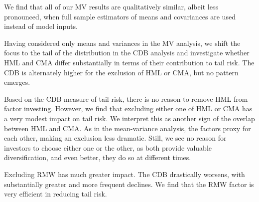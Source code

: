 We find that all of our MV results are qualitatively similar, albeit less pronounced, when full sample estimators of means and covariances are used instead of model inputs.

Having considered only means and variances in the MV analysis, we shift the focus to the tail of the distribution in the CDB analysis and investigate whether HML and CMA differ substantially in terms of their contribution to tail risk. The CDB is alternately higher for the exclusion of HML or CMA, but no pattern emerges. 

Based on the CDB measure of tail risk, there is no reason to remove HML from factor investing. However, we find that excluding either one of HML or CMA has a very modest impact on tail risk. We interpret this as another sign of the overlap between HML and CMA. As in the mean-variance analysis, the factors proxy for each other, making an exclusion less dramatic. Still, we see no reason for investors to choose either one or the other, as both provide valuable diversification, and even better, they do so at different times.

Excluding RMW has much greater impact. The CDB drastically worsens, with substantially greater and more frequent declines. We find that the RMW factor is very efficient in reducing tail risk.
 
